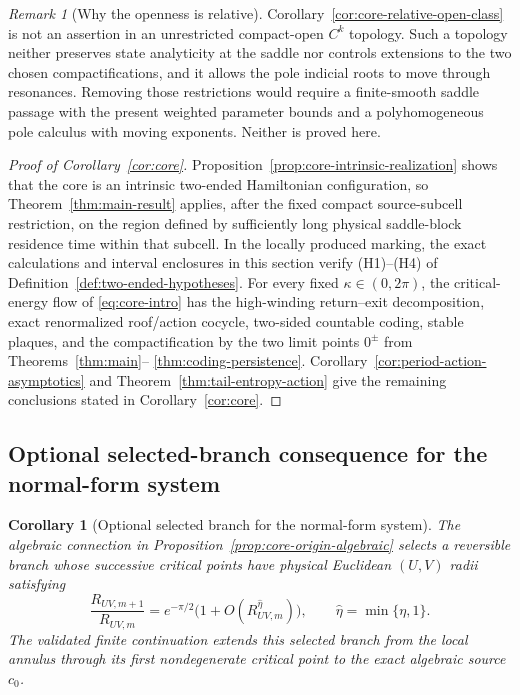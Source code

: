 \documentclass[11pt]{amsart}
\numberwithin{equation}{section}
\newtheorem{corollary}[theorem]{Corollary}
\theoremstyle{definition}
\theoremstyle{remark}
\newtheorem{remark}[theorem]{Remark}
\begin{document}
\begin{remark}[Why the openness is relative]
Corollary~\ref{cor:core-relative-open-class} is not an assertion in an
unrestricted compact-open $C^k$ topology.  Such a topology neither
preserves state analyticity at the saddle nor controls extensions to the
two chosen compactifications, and it allows the pole indicial roots to
move through resonances.  Removing those restrictions would require a
finite-smooth saddle passage with the present weighted parameter bounds
and a polyhomogeneous pole calculus with moving exponents.  Neither is
proved here.
\end{remark}

\begin{proof}[Proof of Corollary~\ref{cor:core}]
Proposition~\ref{prop:core-intrinsic-realization} shows that the core is an
intrinsic two-ended Hamiltonian configuration, so
Theorem~\ref{thm:main-result} applies, after the fixed compact
source-subcell restriction, on the region defined by sufficiently long
physical saddle-block residence time within that subcell.
In the locally produced marking, the exact calculations and interval
enclosures in this section verify \textup{(H1)}--\textup{(H4)} of
Definition~\ref{def:two-ended-hypotheses}.
For every fixed $\kappa\in(0,2\pi)$, the critical-energy flow of
\eqref{eq:core-intro} has the high-winding return--exit decomposition, exact
renormalized roof/action cocycle, two-sided countable coding, stable
plaques, and the compactification by the two limit points $0^\pm$ from
Theorems~\ref{thm:main}--
\ref{thm:coding-persistence}.  Corollary~\ref{cor:period-action-asymptotics}
and Theorem~\ref{thm:tail-entropy-action} give the remaining conclusions
stated in Corollary~\ref{cor:core}.
\end{proof}

\subsection{Optional selected-branch consequence for the normal-form system}

\begin{corollary}[Optional selected branch for the normal-form system]
\label{cor:core-selected-branch}
The algebraic connection in
Proposition~\ref{prop:core-origin-algebraic} selects a reversible branch
whose successive critical points have physical Euclidean $(U,V)$ radii
satisfying
\begin{equation}\label{eq:core-fold-ratio}
 \frac{R_{UV,m+1}}{R_{UV,m}}
 =e^{-\pi/2}\bigl(1+O(R_{UV,m}^{\widehat\eta})\bigr),
 \qquad \widehat\eta=\min\{\eta,1\}.
\end{equation}
The validated finite continuation extends this selected branch from the
local annulus through its first nondegenerate critical point to the exact
algebraic source $c_0$.
\end{corollary}
\end{document}
